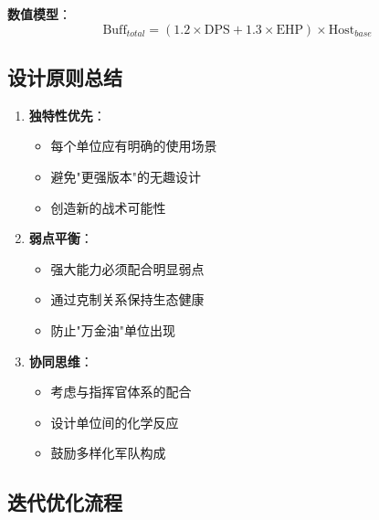 \documentclass[a4paper,12pt]{article}
\begin{document}
\textbf{数值模型}：
\begin{equation}
\text{Buff}_{total} = (1.2 \times \text{DPS} + 1.3 \times \text{EHP}) \times \text{Host}_{base}
\end{equation}

\subsection{设计原则总结}

\begin{enumerate}
\item \textbf{独特性优先}：
   \begin{itemize}
   \item 每个单位应有明确的使用场景
   \item 避免"更强版本"的无趣设计
   \item 创造新的战术可能性
   \end{itemize}

\item \textbf{弱点平衡}：
   \begin{itemize}
   \item 强大能力必须配合明显弱点
   \item 通过克制关系保持生态健康
   \item 防止"万金油"单位出现
   \end{itemize}

\item \textbf{协同思维}：
   \begin{itemize}
   \item 考虑与指挥官体系的配合
   \item 设计单位间的化学反应
   \item 鼓励多样化军队构成
   \end{itemize}
\end{enumerate}

\subsection{迭代优化流程}

\begin{center}
\end{center}
\end{document}

